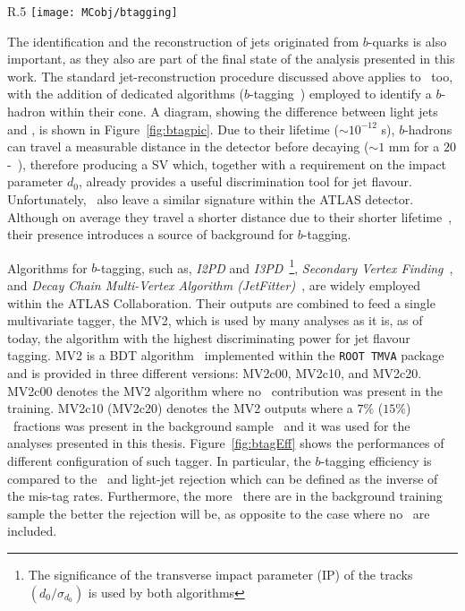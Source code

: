 			\begin{wrapfigure}{R}{.5\textwidth}
				\centering
				\texttt{[image: MCobj/btagging]}
				\caption{\label{fig:btagpic} Diagram showing the common principle of identification of jets initiated by $b$-quark decays~\cite{btagpic}.}
			\end{wrapfigure}

			The identification and the reconstruction of jets originated from $b$-quarks is also important, as they also are part of the final state of the analysis presented in this work. The standard jet-reconstruction procedure discussed above applies to \bjs\, too, with the addition of dedicated algorithms ($b$-tagging~\cite{Aad:2015ydr}) employed to identify a $b$-hadron within their cone. A diagram, showing the difference between light jets and \bjs, is shown in Figure~\ref{fig:btagpic}. Due to their lifetime ($\sim 10^{-12}$ s), $b$-hadrons can travel a measurable distance in the detector before decaying ($\sim 1$ mm for a $20$-\GeV\ \bj), therefore producing a \ac{SV} which, together with a requirement on the impact parameter $d_0$, already provides a useful discrimination tool for jet flavour. Unfortunately, \cjs\ also leave a similar signature within the \ac{ATLAS} detector. Although on average they travel a shorter distance due to their shorter lifetime~\cite{ATL-PHYS-PUB-2015-001}, their presence introduces a source of background for $b$-tagging. 

			Algorithms for $b$-tagging, such as, \emph{I2PD} and \emph{I3PD}~\cite{Lehmacher:1128662}\footnote{The significance of the transverse impact parameter (IP) of the tracks $\left ( d_0/\sigma_{d_0} \right )$ is used by both algorithms}, \emph{Secondary Vertex Finding}~\cite{ATL-PHYS-PUB-2017-011}, and \emph{Decay Chain Multi-Vertex Algorithm (JetFitter)}~\cite{1742-6596-119-3-032032}, are widely employed within the \ac{ATLAS} Collaboration. Their outputs are combined to feed a single multivariate tagger, the \ac{MV2}, which is used by many analyses as it is, as of today, the algorithm with the highest discriminating power for jet flavour tagging. \ac{MV2} is a \ac{BDT} algorithm~\cite{BDT} implemented within the \texttt{ROOT TMVA} package~\cite{Brun:1997pa, 2007physics3039H} and is provided in three different versions: MV2c00, MV2c10, and MV2c20. MV2c00 denotes the MV2 algorithm where no \cj\ contribution was present in the training. MV2c10 (MV2c20) denotes the MV2 outputs where a $7\%$ ($15\%$) \cj\ fractions was present in the background sample~\cite{Aad:2015ydr} and it was used for the analyses presented in this thesis. Figure~\ref{fig:btagEff} shows the performances of different configuration of such tagger. In particular, the $b$-tagging efficiency is compared to the \cjs\ and light-jet rejection which can be defined as the inverse of the mis-tag rates. Furthermore, the more \cjs\ there are in the background training sample the better the rejection will be, as opposite to the case where no \cjs\ are included. 


